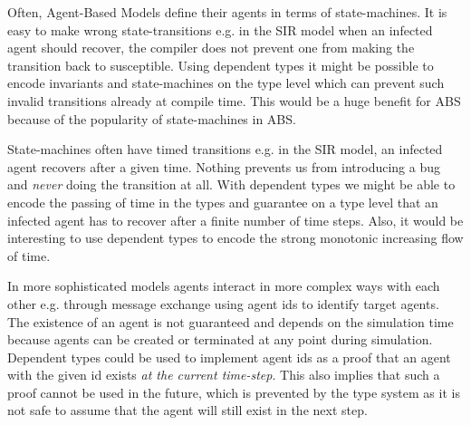 Often, Agent-Based Models define their agents in terms of state-machines. It is easy to make wrong state-transitions e.g. in the SIR model when an infected agent should recover, the compiler does not prevent one from making the transition back to susceptible. Using dependent types it might be possible to encode invariants and state-machines on the type level which can prevent such invalid transitions already at compile time. This would be a huge benefit for ABS because of the popularity of state-machines in ABS.

State-machines often have timed transitions e.g. in the SIR model, an infected agent recovers after a given time. Nothing prevents us from introducing a bug and \textit{never} doing the transition at all. With dependent types we might be able to encode the passing of time in the types and guarantee on a type level that an infected agent has to recover after a finite number of time steps. Also, it would be interesting to use dependent types to encode the strong monotonic increasing flow of time.
	
In more sophisticated models agents interact in more complex ways with each other e.g. through message exchange using agent ids to identify target agents. The existence of an agent is not guaranteed and depends on the simulation time because agents can be created or terminated at any point during simulation. Dependent types could be used to implement agent ids as a proof that an agent with the given id exists \textit{at the current time-step}. This also implies that such a proof cannot be used in the future, which is prevented by the type system as it is not safe to assume that the agent will still exist in the next step. %



